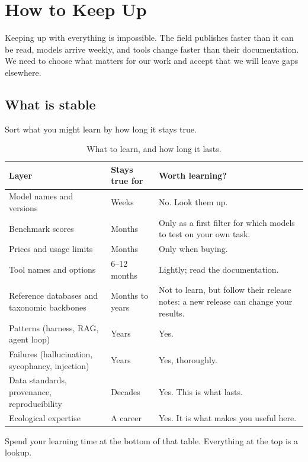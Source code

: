 \chapter{How to Keep Up}
\label{ch:keepingup}

Keeping up with everything is impossible. The field publishes faster than
it can be read, models arrive weekly, and tools change faster than their
documentation. We need to choose what matters for our work and accept that
we will leave gaps elsewhere.

\section{What is stable}

Sort what you might learn by how long it stays true.

\begin{table}[htbp]
\centering
\caption{What to learn, and how long it lasts.}
\label{tab:halflife}
\small
\begin{tabularx}{\textwidth}{XlX}
\toprule
\textbf{Layer} & \textbf{Stays true for} & \textbf{Worth learning?} \\
\midrule
Model names and versions & Weeks & No. Look them up. \\
Benchmark scores & Months & Only as a first filter for which models to test on your own task. \\
Prices and usage limits & Months & Only when buying. \\
Tool names and options & 6--12 months & Lightly; read the documentation. \\
Reference databases and taxonomic backbones & Months to years & Not to learn, but follow their release notes: a new release can change your results. \\
Patterns (harness, RAG, agent loop) & Years & Yes. \\
Failures (hallucination, sycophancy, injection) & Years & Yes, thoroughly. \\
Data standards, provenance, reproducibility & Decades & Yes. This is what lasts. \\
Ecological expertise & A career & Yes. It is what makes you useful here. \\
\bottomrule
\end{tabularx}
\end{table}

\begin{keypoint}
Spend your learning time at the bottom of that table. Everything at the top is a
lookup.
\end{keypoint}

